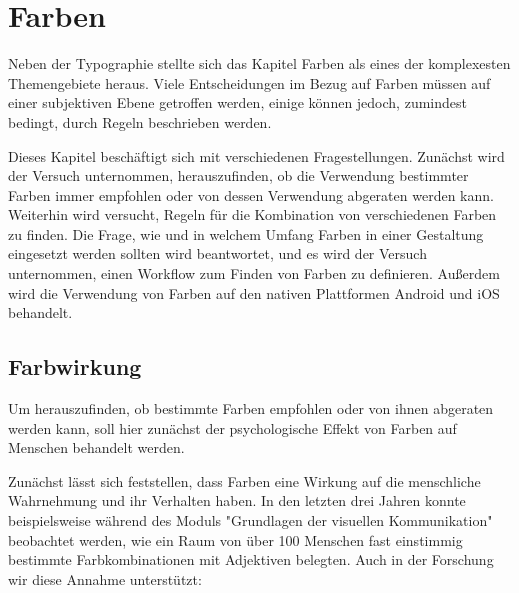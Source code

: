 
\chapter{Farben} %

\label{Farben} %



Neben der Typographie stellte sich das Kapitel Farben als eines der komplexesten Themengebiete heraus. Viele Entscheidungen im Bezug auf Farben müssen auf einer subjektiven Ebene getroffen werden, einige können jedoch, zumindest bedingt, durch Regeln beschrieben werden.

Dieses Kapitel beschäftigt sich mit verschiedenen Fragestellungen. Zunächst wird der Versuch unternommen, herauszufinden, ob die Verwendung bestimmter Farben immer empfohlen oder von dessen Verwendung abgeraten werden kann.
Weiterhin wird versucht, Regeln für die Kombination von verschiedenen Farben zu finden. Die Frage, wie und in welchem Umfang Farben in einer Gestaltung eingesetzt werden sollten wird beantwortet, und es wird der Versuch unternommen, einen Workflow zum Finden von Farben zu definieren. Außerdem wird die Verwendung von Farben auf den nativen Plattformen Android und iOS behandelt.


\section{Farbwirkung}

Um herauszufinden, ob bestimmte Farben empfohlen oder von ihnen abgeraten werden kann, soll hier zunächst der psychologische Effekt von Farben auf Menschen behandelt werden.

Zunächst lässt sich feststellen, dass Farben eine Wirkung auf die menschliche Wahrnehmung und ihr Verhalten haben. In den letzten drei Jahren konnte beispielsweise während des Moduls "Grundlagen der visuellen Kommunikation" beobachtet werden, wie ein Raum von über 100 Menschen fast einstimmig bestimmte Farbkombinationen mit Adjektiven belegten. Auch in der Forschung wir diese Annahme unterstützt:


